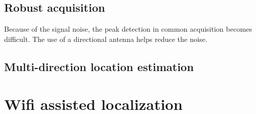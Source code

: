 \documentclass[letterpaper]{article}
\begin{document}
\subsection{Robust acquisition}
Because of the signal noise, the peak detection in common acquisition becomes difficult.
The use of a directional antenna helps reduce the noise.

\subsection{Multi-direction location estimation}



\section{Wifi assisted localization}
\end{document}

